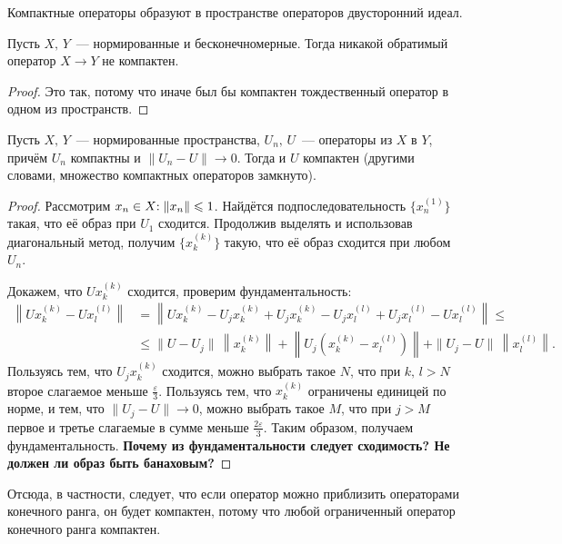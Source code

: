 \documentclass{notes}
\begin{document}
	\begin{rem}
		Компактные операторы образуют в пространстве операторов двусторонний идеал.
	\end{rem}

	\begin{cor}
		Пусть $X, \, Y$~--- нормированные и бесконечномерные. Тогда никакой обратимый оператор $X \to Y$ не компактен.
		\begin{proof}
			Это так, потому что иначе был бы компактен тождественный оператор в одном из пространств.
		\end{proof}
	\end{cor}

	\begin{thm}
		Пусть $X, \, Y$~--- нормированные пространства, $U_n, \, U$~--- операторы из $X$ в $Y$, причём $U_n$ компактны и $\|U_n - U\| \to 0$. Тогда и $U$ компактен (другими словами, множество компактных операторов замкнуто).
		\begin{proof}
			Рассмотрим $x_n \in X\text{\text{:}} \; \|x_n\| \leqslant 1$. Найдётся подпоследовательность $\{x_n^{(1)}\}$ такая, что её образ при $U_1$ сходится. Продолжив выделять и использовав диагональный метод, получим $\{x_k^{(k)}\}$ такую, что её образ сходится при любом $U_n$.

			Докажем, что $Ux_k^{(k)}$ сходится, проверим фундаментальность:
			\begin{align*}
				\left\|U x_k^{(k)} - U x_l^{(l)}\right\| &= \left\|U x_k^{(k)} - U_j x_k^{(k)} + U_j x_k^{(k)} - U_j x_l^{(l)}  + U_j x_l^{(l)} - U x_l^{(l)}\right\| \leqslant \\ &\leqslant \|U - U_j\| \, \left\|x_k^{(k)}\right\| + \left\|U_j\left(x_k^{(k)} - x_l^{(l)}\right)\right\| + \|U_j - U\| \, \left\|x_l^{(l)}\right\|.
			\end{align*}
			Пользуясь тем, что $U_j x_k^{(k)}$ сходится, можно выбрать такое $N$, что при $k, \, l > N$ второе слагаемое меньше $\tfrac{\varepsilon}{3}$. Пользуясь тем, что $x_k^{(k)}$ ограничены единицей по норме, и тем, что $\|U_j - U\| \to 0$, можно выбрать такое $M$, что при $j > M$ первое и третье слагаемые в сумме меньше $\tfrac{2 \varepsilon}{3}$. Таким образом, получаем фундаментальность. \textbf{Почему из фундаментальности следует сходимость? Не должен ли образ быть банаховым?}
		\end{proof}
	\end{thm}

	\begin{cor}
		Отсюда, в частности, следует, что если оператор можно приблизить операторами конечного ранга, он будет компактен, потому что любой ограниченный оператор конечного ранга компактен.
	\end{cor}
\end{document}
